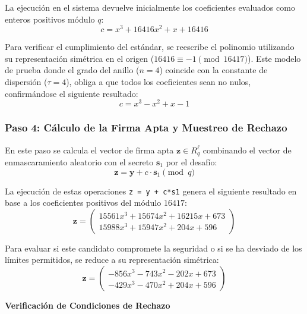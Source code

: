 \documentclass[11pt, a4paper]{report}
\theoremstyle{definition}
\begin{document}
La ejecución en el sistema devuelve inicialmente los coeficientes evaluados como enteros positivos módulo $q$:
\begin{equation}
    c = x^3 + 16416x^2 + x + 16416
\end{equation}

Para verificar el cumplimiento del estándar, se reescribe el polinomio utilizando su representación simétrica en el origen ($16416 \equiv -1 \pmod{16417}$). Este modelo de prueba donde el grado del anillo ($n=4$) coincide con la constante de dispersión ($\tau=4$), obliga a que todos los coeficientes sean no nulos, confirmándose el siguiente resultado:
\begin{equation}
    c = x^3 - x^2 + x - 1
\end{equation}

\subsubsection*{Paso 4: Cálculo de la Firma Apta y Muestreo de Rechazo}

En este paso se calcula el vector de firma apta $\mathbf{z} \in R_q^\ell$ combinando el vector de enmascaramiento aleatorio con el secreto $\mathbf{s}_1$ por el desafío:
\begin{equation}
    \mathbf{z} = \mathbf{y} + c \cdot \mathbf{s}_1 \pmod{q}
\end{equation}

La ejecución de estas operaciones \texttt{z = y + c*s1} genera el siguiente resultado en base a los coeficientes positivos del módulo $16417$:
\begin{equation}
    \mathbf{z} = \begin{pmatrix}
    15561x^3 + 15674x^2 + 16215x + 673 \\
    15988x^3 + 15947x^2 + 204x + 596
    \end{pmatrix}
\end{equation}

Para evaluar si este candidato compromete la seguridad o si se ha desviado de los límites permitidos, se reduce a su representación simétrica:
\begin{equation}
    \mathbf{z} = \begin{pmatrix}
    -856x^3 - 743x^2 - 202x + 673 \\
    -429x^3 - 470x^2 + 204x + 596
    \end{pmatrix}
\end{equation}

\textbf{Verificación de Condiciones de Rechazo}
\end{document}
